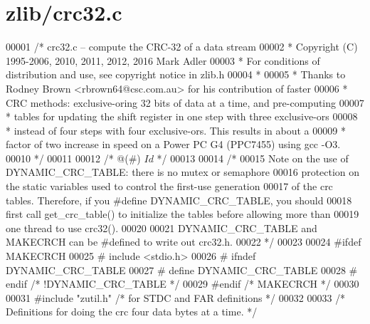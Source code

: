 \hypertarget{zlib_2crc32_8c_source}{}\section{zlib/crc32.c}
\label{zlib_2crc32_8c_source}

\begin{DoxyCode}
00001 \textcolor{comment}{/* crc32.c -- compute the CRC-32 of a data stream}
00002 \textcolor{comment}{ * Copyright (C) 1995-2006, 2010, 2011, 2012, 2016 Mark Adler}
00003 \textcolor{comment}{ * For conditions of distribution and use, see copyright notice in zlib.h}
00004 \textcolor{comment}{ *}
00005 \textcolor{comment}{ * Thanks to Rodney Brown <rbrown64@csc.com.au> for his contribution of faster}
00006 \textcolor{comment}{ * CRC methods: exclusive-oring 32 bits of data at a time, and pre-computing}
00007 \textcolor{comment}{ * tables for updating the shift register in one step with three exclusive-ors}
00008 \textcolor{comment}{ * instead of four steps with four exclusive-ors.  This results in about a}
00009 \textcolor{comment}{ * factor of two increase in speed on a Power PC G4 (PPC7455) using gcc -O3.}
00010 \textcolor{comment}{ */}
00011 
00012 \textcolor{comment}{/* @(#) $Id$ */}
00013 
00014 \textcolor{comment}{/*}
00015 \textcolor{comment}{  Note on the use of DYNAMIC\_CRC\_TABLE: there is no mutex or semaphore}
00016 \textcolor{comment}{  protection on the static variables used to control the first-use generation}
00017 \textcolor{comment}{  of the crc tables.  Therefore, if you #define DYNAMIC\_CRC\_TABLE, you should}
00018 \textcolor{comment}{  first call get\_crc\_table() to initialize the tables before allowing more than}
00019 \textcolor{comment}{  one thread to use crc32().}
00020 \textcolor{comment}{}
00021 \textcolor{comment}{  DYNAMIC\_CRC\_TABLE and MAKECRCH can be #defined to write out crc32.h.}
00022 \textcolor{comment}{ */}
00023 
00024 \textcolor{preprocessor}{#ifdef MAKECRCH}
00025 \textcolor{preprocessor}{#  include <stdio.h>}
00026 \textcolor{preprocessor}{#  ifndef DYNAMIC\_CRC\_TABLE}
00027 \textcolor{preprocessor}{#    define DYNAMIC\_CRC\_TABLE}
00028 \textcolor{preprocessor}{#  endif }\textcolor{comment}{/* !DYNAMIC\_CRC\_TABLE */}\textcolor{preprocessor}{}
00029 \textcolor{preprocessor}{#endif }\textcolor{comment}{/* MAKECRCH */}\textcolor{preprocessor}{}
00030 
00031 \textcolor{preprocessor}{#include "zutil.h"}      \textcolor{comment}{/* for STDC and FAR definitions */}
00032 
00033 \textcolor{comment}{/* Definitions for doing the crc four data bytes at a time. */}

\end{DoxyCode}
